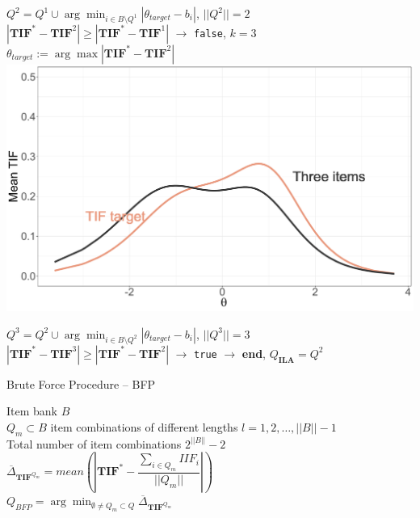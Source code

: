 \documentclass[aspectratio=149, compress]{beamer}
\begin{document}
\begin{frame}
\begin{overprint}
	$Q^2 = Q^{1} \cup \arg\min_{i \in B\setminus Q^1} |\theta_{target} - b_i|$, 	$||Q^2|| = 2$
	$|\mathbf{TIF}^* - \mathbf{TIF}^2| \geq |\mathbf{TIF}^* - \mathbf{TIF}^{1}|$ $\rightarrow$ \texttt{false}, $k = 3$\\
	$\theta_{target} := \arg\max |\mathbf{TIF}^* - \mathbf{TIF}^{2}|$\\
	\onslide<4>
	\centering
	\includegraphics[width=.60\textwidth]{img/TIF-third.pdf}
	
	$Q^3 = Q^{2} \cup \arg\min_{i \in B\setminus Q^2} |\theta_{target} - b_i|$, 	$||Q^3|| = 3$ \\
	$|\mathbf{TIF}^* - \mathbf{TIF}^3| \geq |\mathbf{TIF}^* - \mathbf{TIF}^{2}|$ $\rightarrow$ \texttt{true} $\rightarrow$ \textbf{end}, $Q_{\textbf{ILA}} = Q^2$
\end{overprint}
\end{frame}

\begin{frame}{Brute Force Procedure -- BFP}
	

	Item bank $B$\\
	$Q_m \subset B$ item combinations of different lengths $l = 1, 2, \ldots, ||B||-1$\\ Total number of item combinations $2^{||B||}-2$\\
	$\overline{\Delta}_{\mathbf{TIF}^{Q_m}} =  \mathit{mean}(|\mathbf{TIF}^* - \dfrac{\sum_{i \in Q_m} IIF_i}{||Q_m||}|)$ \\
	$Q_{BFP} = \arg \min_{\emptyset \neq Q_m \subset Q} \overline{\Delta}_{\mathbf{TIF}^{Q_m}}$
	

\end{frame}
\end{document}
